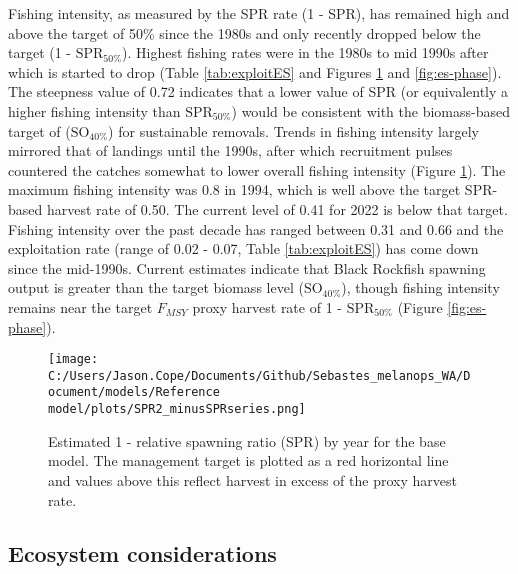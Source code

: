 \documentclass[11pt,
  english,
  letterpaper,
]{article}
\begin{document}
Fishing intensity, as measured by the SPR rate (1 - SPR), has remained high and above the target of 50\% since the 1980s and only recently dropped below the target (1 - \(\text{SPR}_{50\%}\)). Highest fishing rates were in the 1980s to mid 1990s after which is started to drop (Table \ref{tab:exploitES} and Figures \ref{fig:es-1-spr} and \ref{fig:es-phase}). The steepness value of 0.72 indicates that a lower value of SPR (or equivalently a higher fishing intensity than \(\text{SPR}_{50\%}\)) would be consistent with the biomass-based target of (\(\text{SO}_{40\%}\)) for sustainable removals. Trends in fishing intensity largely mirrored that of landings until the 1990s, after which recruitment pulses countered the catches somewhat to lower overall fishing intensity (Figure \ref{fig:es-1-spr}). The maximum fishing intensity was 0.8 in 1994, which is well above the target SPR-based harvest rate of 0.50. The current level of 0.41 for 2022 is below that target. Fishing intensity over the past decade has ranged between 0.31 and 0.66 and the exploitation rate (range of 0.02 - 0.07, Table \ref{tab:exploitES}) has come down since the mid-1990s. Current estimates indicate that Black Rockfish spawning output is greater than the target biomass level (\(\text{SO}_{40\%}\)), though fishing intensity remains near the target \(F_{MSY}\) proxy harvest rate of 1 - \(\text{SPR}_{50\%}\) (Figure \ref{fig:es-phase}).



\begin{figure}
\centering
\texttt{[image: C:/Users/Jason.Cope/Documents/Github/Sebastes\_melanops\_WA/Document/models/Reference model/plots/SPR2\_minusSPRseries.png]}
\caption{Estimated 1 - relative spawning ratio (SPR) by year for the base model. The management target is plotted as a red horizontal line and values above this reflect harvest in excess of the proxy harvest rate.\label{fig:es-1-spr}}
\end{figure}

\clearpage

\hypertarget{ecosystem-considerations}{%
\subsection*{Ecosystem considerations}\label{ecosystem-considerations}}
\end{document}
